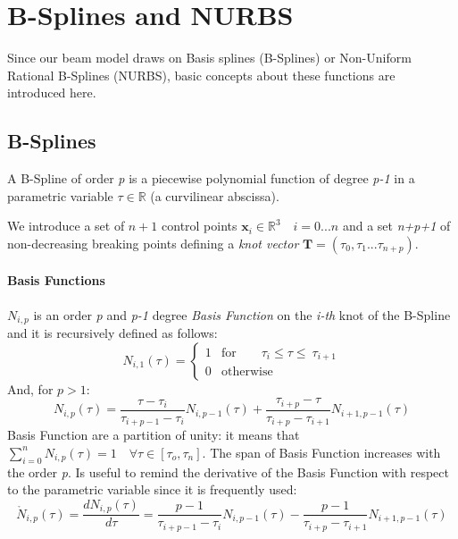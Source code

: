 \documentclass[review]{elsarticle}
\def\avect#1{{\boldsymbol{#1}}}
\begin{document}
\section{B-Splines and NURBS}

Since our beam model draws on Basis splines (B-Splines) or Non-Uniform Rational B-Splines (NURBS), basic concepts about these functions are introduced here.

\subsection{B-Splines}

A B-Spline of order \emph{p} is a piecewise polynomial function of degree \emph{p-1} in a parametric variable $\tau \in \mathbb{R}$ (a curvilinear abscissa).

We introduce a set of $n+1$ control points $\avect{x}_i \in \mathbb{R}^3 \quad i = 0...n$ and a set \emph{n+p+1} of non-decreasing breaking points defining a \emph{knot vector} $\avect{T} =(\tau_0, \tau_1... \tau_{n+p})$. 

\paragraph{Basis Functions} $N_{i,p}$ is an order \emph{p} and \emph{p-1} degree \emph{Basis Function} on the \emph{i-th} knot of the B-Spline and it is recursively defined as follows:
\begin{equation}
\label{eq:BSplineBasis_start}
N_{i,1}(\tau) =\begin{cases}
    1 & \text{for}\qquad \tau_i \leq \tau \leq\ \tau_{i+1}\\
    0 & \text{otherwise}
\end{cases}
\end{equation}
And, for $p>1$:
\begin{equation}
\label{eq:BSplineBasis_iter}
N_{i,p}(\tau) = \frac{\tau-\tau_i}{\tau_{i+p-1}-\tau_i}N_{i,p-1}(\tau) + \frac{\tau_{i+p}-\tau}  {\tau_{i+p}-\tau_{i+1}}N_{i+1,p-1}(\tau) 
\end{equation}
Basis Function are a partition of unity: it means that $\sum_{i=0}^nN_{i,p}(\tau)=1 \quad \forall \tau \in [\tau_o, \tau_n]$. 
The span of Basis Function increases with the order \emph{p}. \newline
Is useful to remind the derivative of the Basis Function with respect to the parametric variable since it is frequently used:
\begin{equation}
\label{BSplineBasis_derivative}
\mathring{N}_{i,p}(\tau) = \frac{dN_{i,p}(\tau)}{d\tau} = \frac{p-1}{\tau_{i+p-1}-\tau_i}N_{i,p-1}(\tau) - \frac{p-1}{\tau_{i+p}-\tau_{i+1}}N_{i+1,p-1}(\tau) 
\end{equation}
\end{document}
